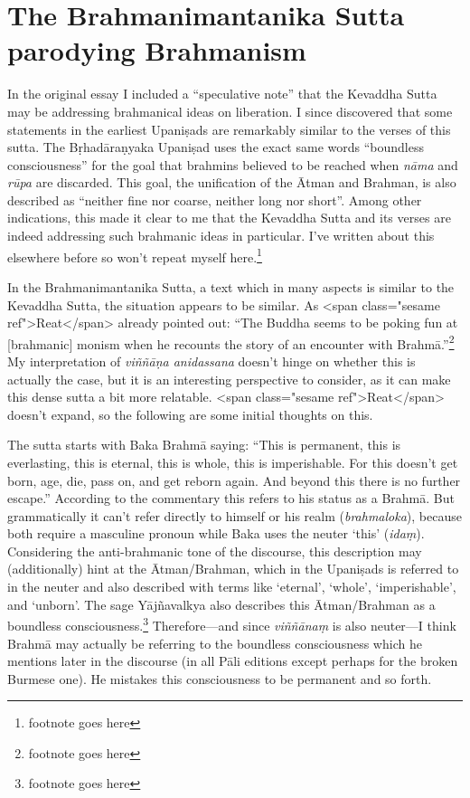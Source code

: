 \documentclass[10pt, openany]{book}
\begin{document}
\section{The Brahmanimantanika Sutta parodying Brahmanism}
In the original essay I included a “speculative note” that the Kevaddha Sutta may be addressing brahmanical ideas on liberation. I since discovered that some statements in the earliest Upaniṣads are remarkably similar to the verses of this sutta. The Bṛhadāraṇyaka Upaniṣad uses the exact same words “boundless consciousness” for the goal that brahmins believed to be reached when \textit{nāma} and \textit{rūpa} are discarded. This goal, the unification of the Ātman and Brahman, is also described as “neither fine nor coarse, neither long nor short”. Among other indications, this made it clear to me that the Kevaddha Sutta and its verses are indeed addressing such brahmanic ideas in particular. I’ve written about this elsewhere before so won’t repeat myself here.\footnote{footnote goes here}


In the Brahmanimantanika Sutta, a text which in many aspects is similar to the Kevaddha Sutta, the situation appears to be similar. As <span class="sesame ref">Reat</span> already pointed out: “The Buddha seems to be poking fun at [brahmanic] monism when he recounts the story of an encounter with Brahmā.”\footnote{footnote goes here} My interpretation of \textit{viññāṇa anidassana} doesn’t hinge on whether this is actually the case, but it is an interesting perspective to consider, as it can make this dense sutta a bit more relatable. <span class="sesame ref">Reat</span> doesn’t expand, so the following are some initial thoughts on this.


The sutta starts with Baka Brahmā saying: “This is permanent, this is everlasting, this is eternal, this is whole, this is imperishable. For this doesn’t get born, age, die, pass on, and get reborn again. And beyond this there is no further escape.” According to the commentary this refers to his status as a Brahmā. But grammatically it can’t refer directly to himself or his realm (\textit{brahma­loka}), because both require a masculine pronoun while Baka uses the neuter ‘this’ (\textit{idaṃ}). Considering the anti-brahmanic tone of the discourse, this description may (additionally) hint at the Ātman/Brahman, which in the Upaniṣads is referred to in the neuter and also described with terms like ‘eternal’, ‘whole’, ‘imperishable’, and ‘unborn’. The sage Yājñavalkya also describes this Ātman/Brahman as a boundless consciousness.\footnote{footnote goes here} Therefore—and since \textit{viññānaṃ} is also neuter—I think Brahmā may actually be referring to the boundless consciousness which he mentions later in the discourse (in all Pāli editions except perhaps for the broken Burmese one). He mistakes this consciousness to be permanent and so forth.
\end{document}
